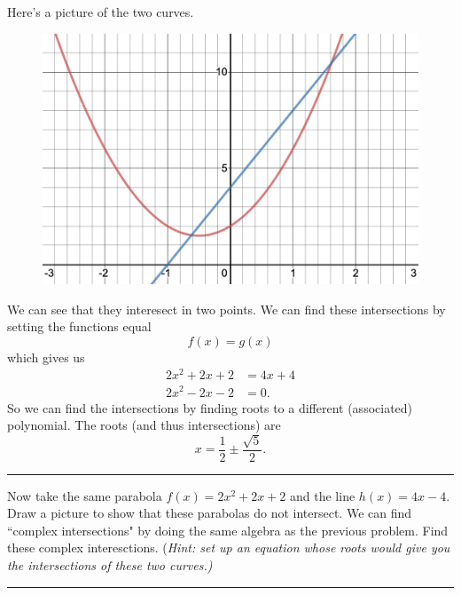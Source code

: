 \documentclass[12pt]{article} %
\begin{document}
\begin{solution}
Here's a picture of the two curves.
\begin{figure}[H]
    \centering
    \includegraphics[width=.8\textwidth]{Homework_0/desmos-graph.png}
\end{figure}
We can see that they interesect in two points. We can find these intersections by setting the functions equal
\[
f(x)=g(x)
\]
which gives us
\begin{align*}
    2x^2+2x+2&=4x+4\\
    2x^2-2x-2&=0.
\end{align*}
So we can find the intersections by finding roots to a different (associated) polynomial. The roots (and thus intersections) are
\[
x=\frac{1}{2}\pm \frac{\sqrt{5}}{2}.
\]
\end{solution}

\hrule

\begin{problem}
    Now take the same parabola $f(x)=2x^2+2x+2$ and the line $h(x)=4x-4$. Draw a picture to show that these parabolas do not intersect. We can find ``complex intersections" by doing the same algebra as the previous problem. Find these complex interesctions. (\emph{Hint: set up an equation whose roots would give you the intersections of these two curves.)}
\end{problem}

\hrule
\end{document}
